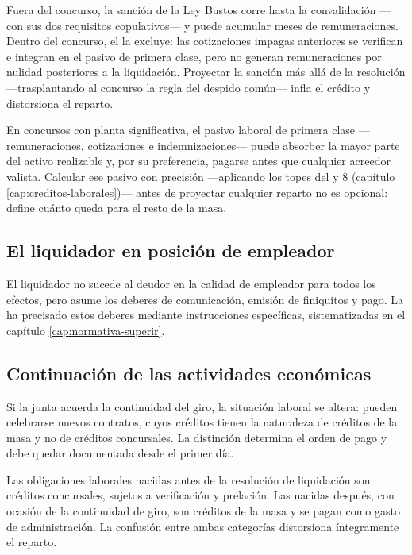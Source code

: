 \begin{foco}
Fuera del concurso, la sanción de la Ley Bustos corre hasta la convalidación ---con sus dos
requisitos copulativos--- y puede acumular meses de remuneraciones. Dentro del concurso, el
 la excluye: las cotizaciones impagas anteriores se verifican e integran en el pasivo
de primera clase, pero no generan remuneraciones por nulidad posteriores a la liquidación.
Proyectar la sanción más allá de la resolución ---trasplantando al concurso la regla del despido
común--- infla el crédito y distorsiona el reparto.
\end{foco}

\begin{practica}
En concursos con planta significativa, el pasivo laboral de primera clase ---remuneraciones,
cotizaciones e indemnizaciones--- puede absorber la mayor parte del activo realizable y, por su
preferencia, pagarse antes que cualquier acreedor valista. Calcular ese pasivo con precisión
---aplicando los topes del   y 8 (capítulo \ref{cap:creditos-laborales})--- antes
de proyectar cualquier reparto no es opcional: define cuánto queda para el resto de la masa.
\end{practica}

\subsection{El liquidador en posición de empleador}

El liquidador no sucede al deudor en la calidad de empleador para todos los efectos, pero
asume los deberes de comunicación, emisión de finiquitos y pago. La \superir{} ha
precisado estos deberes mediante instrucciones específicas, sistematizadas en el capítulo
\ref{cap:normativa-superir}.

\subsection{Continuación de las actividades económicas}

Si la junta acuerda la continuidad del giro, la situación laboral se altera: pueden
celebrarse nuevos contratos, cuyos créditos tienen la naturaleza de créditos de la masa y
no de créditos concursales. La distinción determina el orden de pago y debe quedar
documentada desde el primer día.

\begin{alerta}
Las obligaciones laborales nacidas antes de la resolución de liquidación son créditos
concursales, sujetos a verificación y prelación. Las nacidas después, con ocasión de la
continuidad de giro, son créditos de la masa y se pagan como gasto de administración. La
confusión entre ambas categorías distorsiona íntegramente el reparto.
\end{alerta}

